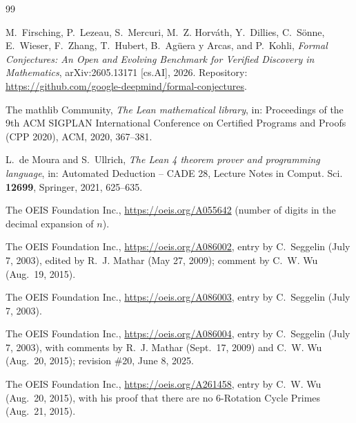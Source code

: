 \documentclass[11pt]{amsart}
\theoremstyle{plain}
\theoremstyle{definition}
\begin{document}
\begin{thebibliography}{99}

M.~Firsching, P.~Lezeau, S.~Mercuri, M.~Z. Horv\'ath, Y.~Dillies, C.~S\"onne, E.~Wieser, F.~Zhang, T.~Hubert, B.~Ag\"uera y Arcas, and P.~Kohli, \emph{Formal Conjectures: An Open and Evolving Benchmark for Verified Discovery in Mathematics}, arXiv:2605.13171 [cs.AI], 2026. Repository: \url{https://github.com/google-deepmind/formal-conjectures}.

The mathlib Community, \emph{The Lean mathematical library}, in: Proceedings of the 9th ACM SIGPLAN International Conference on Certified Programs and Proofs (CPP 2020), ACM, 2020, 367--381.

L.~de Moura and S.~Ullrich, \emph{The Lean 4 theorem prover and programming language}, in: Automated Deduction -- CADE 28, Lecture Notes in Comput. Sci. \textbf{12699}, Springer, 2021, 625--635.

The OEIS Foundation Inc., \url{https://oeis.org/A055642} (number of digits in the decimal expansion of $n$).

The OEIS Foundation Inc., \url{https://oeis.org/A086002}, entry by C.~Seggelin (July 7, 2003), edited by R.~J. Mathar (May 27, 2009); comment by C.~W. Wu (Aug.~19, 2015).

The OEIS Foundation Inc., \url{https://oeis.org/A086003}, entry by C.~Seggelin (July 7, 2003).

The OEIS Foundation Inc., \url{https://oeis.org/A086004}, entry by C.~Seggelin (July 7, 2003), with comments by R.~J. Mathar (Sept.~17, 2009) and C.~W. Wu (Aug.~20, 2015); revision \#20, June 8, 2025.

The OEIS Foundation Inc., \url{https://oeis.org/A261458}, entry by C.~W. Wu (Aug.~20, 2015), with his proof that there are no 6-Rotation Cycle Primes (Aug.~21, 2015).

\end{thebibliography}
\end{document}
